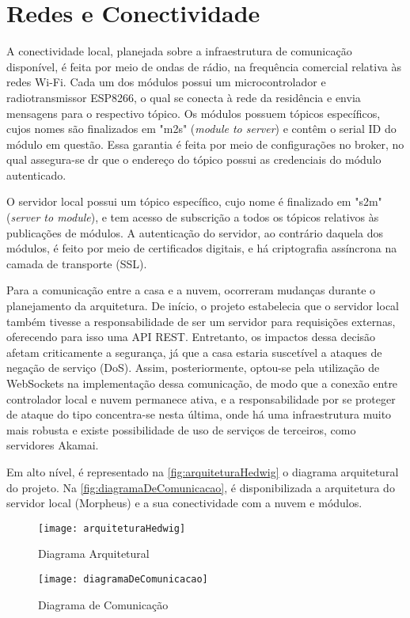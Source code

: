 \section{Redes e Conectividade}

A conectividade local, planejada sobre a infraestrutura de comunicação disponível, é feita por meio de ondas de rádio, na frequência comercial relativa às redes Wi-Fi. Cada um dos módulos possui um microcontrolador e radiotransmissor ESP8266, o qual se conecta à rede da residência e envia mensagens para o respectivo tópico. Os módulos possuem tópicos específicos, cujos nomes são finalizados em "m2s" (\emph{module to server}) e contêm o serial ID do módulo em questão. Essa garantia é feita por meio de configurações no broker, no qual assegura-se dr que o endereço do tópico possui as credenciais do módulo autenticado.

O servidor local possui um tópico específico, cujo nome é finalizado em "s2m" (\emph{server to module}), e tem acesso de subscrição a todos os tópicos relativos às publicações de módulos. A autenticação do servidor, ao contrário daquela dos módulos, é feito por meio de certificados digitais, e há criptografia assíncrona na camada de transporte (SSL).

Para a comunicação entre a casa e a nuvem, ocorreram mudanças durante o planejamento da arquitetura. De início, o projeto estabelecia que o servidor local também tivesse a responsabilidade de ser um servidor para requisições externas, oferecendo para isso uma API REST. Entretanto, os impactos dessa decisão afetam criticamente a segurança, já que a casa estaria suscetível a ataques de negação de serviço (DoS). Assim, posteriormente, optou-se pela utilização de WebSockets na implementação dessa comunicação, de modo que a conexão entre controlador local e nuvem permanece ativa, e a responsabilidade por se proteger de ataque do tipo concentra-se nesta última, onde há uma infraestrutura muito mais robusta e existe possibilidade de uso de serviços de terceiros, como servidores Akamai.

Em alto nível, é representado na \autoref{fig:arquiteturaHedwig} o diagrama arquitetural do projeto. Na \autoref{fig:diagramaDeComunicacao}, é disponibilizada a arquitetura do servidor local (Morpheus) e a sua conectividade com a nuvem e módulos.

\begin{figure}[htb]
	\caption{\label{fig:arquiteturaHedwig}Diagrama Arquitetural}
	\begin{center}
	    \texttt{[image: arquiteturaHedwig]}
	\end{center}
\end{figure}

\begin{figure}[htb]
	\caption{\label{fig:diagramaDeComunicacao}Diagrama de Comunicação}
	\begin{center}
	    \texttt{[image: diagramaDeComunicacao]}
	\end{center}
\end{figure}

